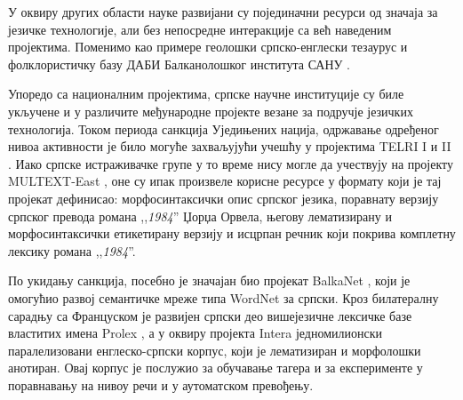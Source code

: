 {\begin{multicols}{2}
У оквиру других области науке развијани су појединачни ресурси од значаја за језичке технологије, али без непосредне интеракције са већ наведеним пројектима. Поменимо као примере геолошки српско-енглески тезаурус \cite{RGF} и фолклористичку базу ДАБИ Балканолошког института САНУ  \cite{BALKANINSTITUT}.

Упоредо са националним пројектима, српске научне институције су биле укључене и у различите међународне пројекте везане за подручје језичких технологија. Током периода санкција Уједињених нација, одржавање одређеног нивоа активности је било могуће захваљујући учешћу у пројектима TELRI I и II \cite{TELRI}. Иако српске истраживачке групе у то време нису могле да учествују на пројекту MULTEXT-East \cite{NL}, оне су ипак произвеле корисне ресурсе у формату који је тај пројекат дефинисао: морфосинтаксички опис српског језика, поравнату верзију српског превода романа ,,\textit{1984}'' Џорџа Орвела, његову лематизирану и морфосинтаксички етикетирану верзију и исцрпан речник који покрива комплетну лексику романа ,,\textit{1984}''. 


По укидању санкција, посебно је значајан био пројекат BalkaNet \cite{CORDIS}, који је омогућио развој семантичке мреже типа WordNet за српски. Кроз билатералну сарадњу са Француском је развијен српски део вишејезичне лексичке базе властитих имена Prolex \cite{CNRTL}, а у оквиру пројекта Intera једномилионски паралелизовани енглеско-српски корпус, који је лематизиран и морфолошки анотиран. Овај корпус је послужио за обучавање тагера и за експерименте у поравнавању на нивоу речи и у аутоматском превођењу.


\end{multicols}}
